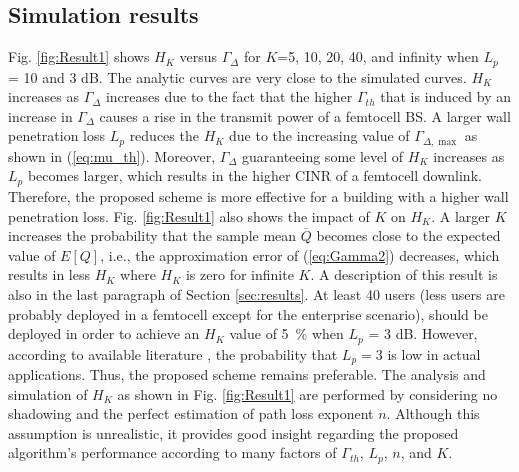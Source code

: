 \documentclass[draftclsnofoot,12pt,onecolumn]{IEEEtran}
\begin{document}
\subsection{Simulation results}
Fig. \ref{fig:Result1} shows $H_K$ versus $\Gamma_{\Delta}$ for
$K$=5, 10, 20, 40, and infinity when $L_p$ = 10 and 3 dB. The
analytic curves are very close to the simulated curves. $H_K$
increases as $\Gamma_{\Delta}$ increases due to the fact that the
higher $\Gamma_{th}$ that is induced by an increase in
$\Gamma_{\Delta}$ causes a rise in the transmit power of a femtocell
BS. A larger wall penetration loss $L_p$ reduces the $H_K$ due to
the increasing value of $\Gamma_{\Delta,\max}$ as shown in
(\ref{eq:mu_th}). Moreover, $\Gamma_{\Delta}$ guaranteeing some
level of $H_K$ increases as $L_p$ becomes larger, which results in
the higher CINR of a femtocell downlink. Therefore, the proposed
scheme is more effective for a building with a higher wall
penetration loss. Fig. \ref{fig:Result1} also shows the impact of
$K$ on $H_K$. A larger $K$ increases the probability that the sample
mean $\overline{Q}$ becomes close to the expected value of $E[Q]$,
i.e., the approximation error of (\ref{eq:Gamma2}) decreases, which
results in less $H_K$ where $H_K$ is zero for infinite $K$. A
description of this result is also in the last paragraph of Section
\ref{sec:results}. At least 40 users (less users are probably
deployed in a femtocell except for the enterprise scenario), should
be deployed in order to achieve an $H_K$ value of 5~\% when $L_p$ =
3 dB. However, according to available literature
\cite{WallLoss1}\cite{WallLoss3}, the probability that $L_p=3$ is
low in actual applications. Thus, the proposed scheme remains
preferable. The analysis and simulation of $H_K$ as shown in Fig.
\ref{fig:Result1} are performed by considering no shadowing and the
perfect estimation of path loss exponent $n$. Although this
assumption is unrealistic, it provides good insight regarding the
proposed algorithm's performance according to many factors of
$\Gamma_{th}$, $L_p$, $n$, and $K$.
\end{document}
